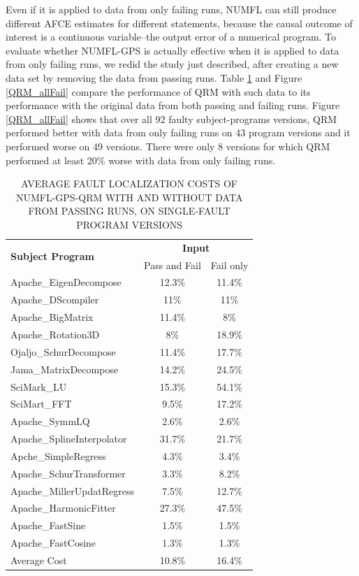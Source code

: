 \documentclass[times]{stvrauth}
\begin{document}
Even if it is applied to data from only failing runs, NUMFL can still produce different AFCE estimates for different statements, because the causal outcome of interest is a continuous variable--the output error of a numerical program.  To evaluate whether NUMFL-GPS is actually effective when it is applied to data from only failing runs, we redid the study just described, after creating a new data set by removing the data from passing runs.  Table \ref{table3} and Figure \ref{QRM_allFail} compare the performance of QRM with such data to its performance with the original data from both passing and failing runs.  Figure \ref{QRM_allFail} shows that over all 92 faulty subject-programs versions, QRM performed better with data from only failing runs on 43 program versions and it performed worse on 49 versions.  There were only 8 versions for which QRM performed at least 20\% worse with data from only failing runs.
\begin{table}[htbp!]
\caption{AVERAGE FAULT LOCALIZATION COSTS OF NUMFL-GPS-QRM WITH AND WITHOUT DATA FROM PASSING RUNS, ON SINGLE-FAULT PROGRAM VERSIONS}
\label{table3}
\centering
      \begin{tabular}{|l|c|c|}
      \hline
\multirow{2}{*}{{\bf Subject Program}}	&	\multicolumn{2}{|c|}{{\bf Input}}	\\	\cline{2-3}
& Pass and Fail	&Fail only \\ \hline
Apache\_EigenDecompose	&	12.3\%	&	11.4\%	\\	\hline
Apache\_DScompiler	&	11\%	&	11\%	\\	\hline
Apache\_BigMatrix	&	11.4\%	&	8\%	\\	\hline
Apache\_Rotation3D	&	8\%	&	18.9\%	\\	\hline
Ojaljo\_SchurDecompose	&	11.4\%	&	17.7\%	\\	\hline
Jama\_MatrixDecompose	&	14.2\%	&	24.5\%	\\	\hline
SciMark\_LU	&	15.3\%	&	54.1\%	\\	\hline
SciMart\_FFT	&	9.5\%	&	17.2\%	\\	\hline
Apache\_SymmLQ	&	2.6\%	&	2.6\%	\\	\hline
Apache\_SplineInterpolator	&	31.7\%	&	21.7\%	\\	\hline
Apche\_SimpleRegress	&	4.3\%	&	3.4\%	\\	\hline
Apache\_SchurTransformer	&	3.3\%	&	8.2\%	\\	\hline
Apache\_MillerUpdatRegress	&	7.5\%	&	12.7\%	\\	\hline
Apache\_HarmonicFitter	&	27.3\%	&	47.5\%	\\	\hline
Apache\_FastSine	&	1.5\%	&	1.5\%	\\	\hline
Apache\_FastCosine	&	1.3\%	&	1.3\%	\\	\hline
Average Cost	&	10.8\%	&	16.4\%	\\	\hline
\end{tabular}
\end{table}
\end{document}

